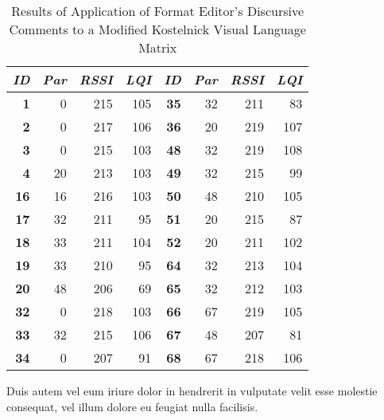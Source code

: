 \begin{table}
\begin{center}
\begin{tabular}{|r|r|r|r||r|r|r|r|}
\hline \textbf{\textit{ID}} & \textbf{\textit{Par}} & \textbf{\textit{RSSI}} &
\textbf{\textit{LQI}} &
\textbf{\textit{ID}} & \textbf{\textit{Par}} & \textbf{\textit{RSSI}} & \textbf{\textit{LQI}} \\
\hline \hline
\textbf{1}  &  0 & 215 & 105 & \textbf{35} & 32 & 211 &  83 \\
\textbf{2}  &  0 & 217 & 106 & \textbf{36} & 20 & 219 & 107 \\
\textbf{3}  &  0 & 215 & 103 & \textbf{48} & 32 & 219 & 108 \\
\textbf{4}  & 20 & 213 & 103 & \textbf{49} & 32 & 215 &  99 \\
\textbf{16} & 16 & 216 & 103 & \textbf{50} & 48 & 210 & 105 \\
\textbf{17} & 32 & 211 &  95 & \textbf{51} & 20 & 215 &  87 \\
\textbf{18} & 33 & 211 & 104 & \textbf{52} & 20 & 211 & 102 \\
\textbf{19} & 33 & 210 &  95 & \textbf{64} & 32 & 213 & 104 \\
\textbf{20} & 48 & 206 &  69 & \textbf{65} & 32 & 212 & 103 \\
\textbf{32} &  0 & 218 & 103 & \textbf{66} & 67 & 219 & 105 \\
\textbf{33} & 32 & 215 & 106 & \textbf{67} & 48 & 207 &  81 \\
\textbf{34} &  0 & 207 &  91 & \textbf{68} & 67 & 218 & 106 \\
\hline
\end{tabular}
\caption[Results of Application of Format Editor's Discursive Comments
\newline to a Modified Kostelnick Visual Language Matrix]{Results of Application of Format Editor's Discursive Comments to a Modified Kostelnick Visual Language Matrix}
\end{center}
\end{table}

Duis autem vel eum iriure dolor in hendrerit in vulputate velit esse molestie
consequat, vel illum dolore eu feugiat nulla facilisis.

